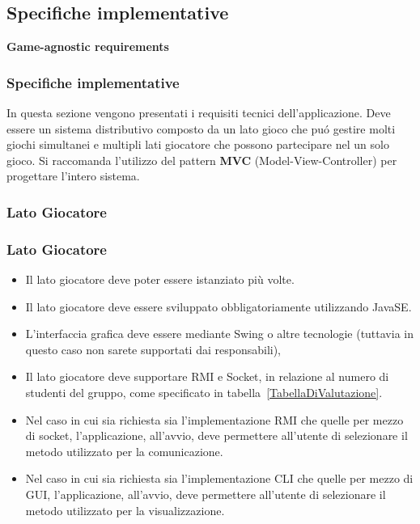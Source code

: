 \documentclass{beamer}
\begin{document}
\subsection{Specifiche implementative}

\begin{frame}
\LARGE	
\textbf{Game-agnostic requirements}

\end{frame}

\begin{frame}
\frametitle{Specifiche implementative}
In questa sezione vengono presentati i requisiti tecnici
dell'applicazione.  Deve essere un sistema distributivo composto da
un lato gioco che pu\'o gestire molti giochi simultanei e multipli
lati giocatore che possono partecipare nel un solo gioco. Si raccomanda
l'utilizzo del pattern \textbf{MVC} (Model-View-Controller) per
progettare l'intero sistema.
\end{frame}

\subsubsection{Lato Giocatore}
\begin{frame}
\frametitle{Lato Giocatore}
\begin{itemize}
\item Il lato giocatore deve poter essere istanziato pi\`u volte. 
\item Il lato giocatore deve essere sviluppato obbligatoriamente utilizzando JavaSE. 
\item L'interfaccia grafica deve essere mediante Swing o altre
  tecnologie (tuttavia in questo caso non sarete supportati dai responsabili), 
\item Il lato giocatore deve supportare RMI e Socket, in relazione al numero di studenti del gruppo, come specificato in tabella~\ref{TabellaDiValutazione}. 
\item Nel caso in cui sia richiesta sia l'implementazione RMI che
  quelle per mezzo di socket, l'applicazione, all'avvio, deve permettere
  all'utente di selezionare il metodo utilizzato per la
  comunicazione.
\item Nel caso in cui sia richiesta sia l'implementazione CLI che
  quelle per mezzo di GUI, l'applicazione, all'avvio, deve permettere
  all'utente di selezionare il metodo utilizzato per la
  visualizzazione.
\end{itemize}
\end{frame}
\end{document}
